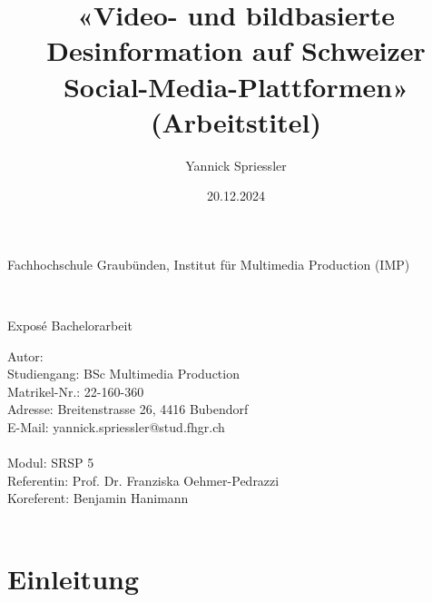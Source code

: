 \documentclass[12pt,a4paper]{article}        %
\title{«Video- und bildbasierte Desinformation auf Schweizer Social-Media-Plattformen» (Arbeitstitel)}        %
\author{Yannick Spriessler}     %
\date{20.12.2024}     %
\begin{document}
  
    \begin{titlingpage} %
    \begin{center}
    \begin{large}
    Fachhochschule Graubünden, Institut für Multimedia Production (IMP)\\ %
    \end{large}
    \vspace{2cm} %
    \begin{LARGE} 
    \textbf{\thetitle} \\
    \end{LARGE}
    \vspace{1cm}
    \begin{large}
    Exposé Bachelorarbeit\\
    \end{large}
    \vspace{5cm} %
    Autor: \theauthor \\
    Studiengang: BSc Multimedia Production \\
    Matrikel-Nr.: 22-160-360 \\
    Adresse: Breitenstrasse 26, 4416 Bubendorf \\
    E-Mail: yannick.spriessler@stud.fhgr.ch \\ \\
    Modul: SRSP 5 \\
    Referentin: Prof. Dr. Franziska Oehmer-Pedrazzi \\
    Koreferent: Benjamin Hanimann \\ \\
    \thedate
    \end{center}
    \end{titlingpage}
    

    \section{Einleitung}
\end{document}
